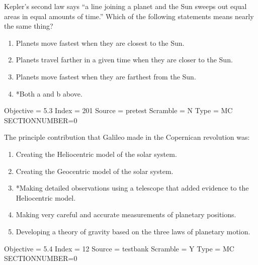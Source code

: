 \documentclass[11pt]{article}
\begin{document}
\begin{enumerate}
\begin{minipage}{\textwidth}
\begin{minipage}{\textwidth}
\item Kepler’s second law says ``a line joining a planet and the Sun sweeps out equal areas in equal amounts of time.'' Which of the following statements means nearly the same thing?
\begin{enumerate} 
\setlength{\itemsep}{1pt} 
\setlength{\parskip}{0pt} 
\setlength{\parsep}{0pt}
\setlength{\multicolsep}{1pt} 
\item 	Planets move fastest when they are closest to the Sun.
\item Planets travel farther in a given time when they are closer to the Sun.
\item Planets move fastest when they are farthest from the Sun.
\item *Both a and b above.
\end{enumerate} 
Objective = 5.3
Index = 201
Source = pretest
Scramble = N
Type = MC
SECTIONNUMBER=0
\end{minipage}
\end{minipage}
\vskip 0.20in

\begin{minipage}{\textwidth}
\begin{minipage}{\textwidth}
\item The principle contribution that Galileo made in the Copernican revolution was:
\begin{enumerate} 
\setlength{\itemsep}{1pt} 
\setlength{\parskip}{0pt} 
\setlength{\parsep}{0pt}
\setlength{\multicolsep}{1pt} 
\item Creating the Heliocentric model of the solar system.
\item Creating the Geocentric model of the solar system.
\item *Making detailed observations using a telescope that added evidence to the Heliocentric model.
\item Making very careful and accurate measurements of planetary positions.
\item Developing a theory of gravity based on the three laws of planetary motion.
\end{enumerate} 
Objective = 5.4
Index = 12
Source = testbank
Scramble = Y
Type = MC
SECTIONNUMBER=0
\end{minipage}
\end{minipage}
\vskip 0.20in


\end{enumerate}
\end{document}
